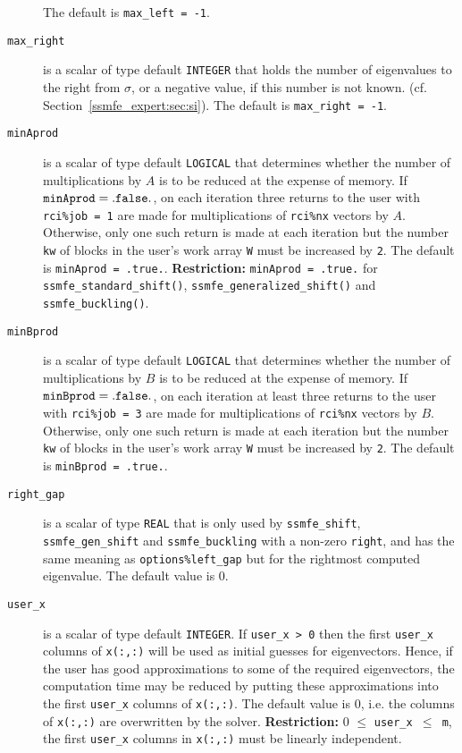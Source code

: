 \begin{description}
The default is {\tt max\_left = -1}.
%
\item[\texttt{max\_right}]
is a scalar of type default \texttt{INTEGER} that
holds the number of eigenvalues to the right from $\sigma$,
or a negative value, if this number is not known.
(cf. Section~\ref{ssmfe_expert:sec:si}).
The default is {\tt max\_right = -1}.
%
\item[\texttt{minAprod}] is a scalar of type default \texttt{LOGICAL} that
determines whether the number of multiplications by $A$ 
is to be reduced at the expense of memory. 
If ${\tt minAprod = .false.}$, 
on each iteration three returns to the user
with {\tt rci\%job = 1} are
made for multiplications of {\tt rci\%nx} vectors by $A$.
Otherwise,  only one such return is made at each iteration but 
the number {\tt kw} of blocks in the user's work array {\tt W} 
must be increased by {\tt 2}.
The default is {\tt minAprod = .true.}.
{\bf Restriction:} {\tt minAprod = .true.} %
for {\tt ssmfe\_standard\_shift()}, {\tt ssmfe\_generalized\_shift()}
and  {\tt ssmfe\_buckling()}.
%
\item[\texttt{minBprod}] is a scalar of type default \texttt{LOGICAL} that
determines whether the number of multiplications by $B$ 
is to be reduced at the expense of memory. 
If ${\tt minBprod = .false.}$, 
on each iteration at least three returns to the user
with {\tt rci\%job = 3} are
made for multiplications of {\tt rci\%nx} vectors by $B$.
Otherwise,  only one such return is made at each iteration but 
the number {\tt kw} of blocks in the user's work array {\tt W} 
must be increased by {\tt 2}.
The default is {\tt minBprod = .true.}.
%
\item[\texttt{right\_gap}]
is a scalar of type \texttt{REAL}
that is only used by 
{\tt ssmfe\_shift}, {\tt ssmfe\_gen\_shift}
and {\tt ssmfe\_buckling}
with a non-zero {\tt right}, and
has the same meaning as {\tt options\%left\_gap}
but for the rightmost computed eigenvalue.
The default value is 0.
%
\item[\texttt{user\_x}] is a scalar of type default \texttt{INTEGER}. 
If {\tt user\_x > 0} then the first {\tt user\_x} columns
of {\tt x(:,:)} will be used as initial guesses for eigenvectors.
Hence, if the user has good approximations
to some of the required eigenvectors, the computation time
may be reduced by putting these approximations
into the first {\tt user\_x} columns of {\tt x(:,:)}.
The default value is 0, 
i.e. the columns of {\tt x(:,:)} are overwritten by the solver.
{\bf Restriction:} {0 $\le$ \tt user\_x $\le$ m},
the first {\tt user\_x} columns in {\tt x(:,:)}
must be linearly independent.
%
\end{description}

